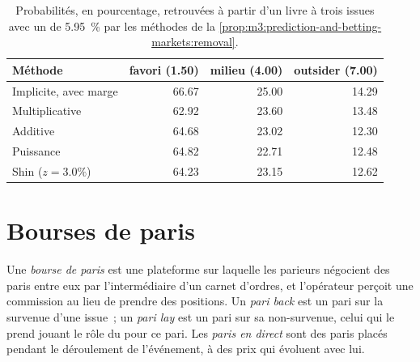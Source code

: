\begin{table}[ht]
\centering
\small
\begin{tabular}{@{}lrrr@{}}
\toprule
Méthode & favori (1.50) & milieu (4.00) & outsider (7.00) \\
\midrule
Implicite, avec marge & 66.67 & 25.00 & 14.29 \\
Multiplicative & 62.92 & 23.60 & 13.48 \\
Additive & 64.68 & 23.02 & 12.30 \\
Puissance & 64.82 & 22.71 & 12.48 \\
Shin ($z = 3.0\%$) & 64.23 & 23.15 & 12.62 \\
\bottomrule
\end{tabular}
\caption{Probabilités, en pourcentage, retrouvées à partir d'un livre à trois issues avec un  de 5.95~\% par les méthodes de la
\cref{prop:m3:prediction-and-betting-markets:removal}.}\label{tab:m3:prediction-and-betting-markets:methods}
\end{table}

\section{Bourses de paris}

\begin{definition}\label{def:m3:prediction-and-betting-markets:exchange}
Une \emph{bourse de paris} est une plateforme sur laquelle les parieurs négocient des paris entre eux par l'intermédiaire d'un carnet d'ordres, et l'opérateur perçoit une commission au lieu de prendre des positions.
Un \emph{pari back} est un pari sur la survenue d'une issue~; un \emph{pari
lay} est un pari sur sa non-survenue, celui qui le prend jouant le rôle du  pour ce pari. Les
\emph{paris en direct} sont des paris placés pendant le déroulement de l'événement, à des prix qui évoluent avec lui.
\end{definition}

